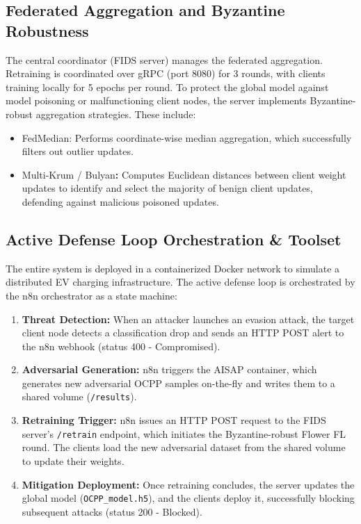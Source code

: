 \documentclass[10pt, a4paper, conference]{IEEEtran}
\begin{document}
\subsection{Federated Aggregation and Byzantine Robustness}
The central coordinator (FIDS server) manages the federated aggregation. Retraining is coordinated over gRPC (port 8080) for 3 rounds, with clients training locally for 5 epochs per round. To protect the global model against model poisoning or malfunctioning client nodes, the server implements Byzantine-robust aggregation strategies. These include:
\begin{itemize}
    \item FedMedian: Performs coordinate-wise median aggregation, which successfully filters out outlier updates.
    \item Multi-Krum / Bulyan\textbf{:} Computes Euclidean distances between client weight updates to identify and select the majority of benign client updates, defending against malicious poisoned updates.
\end{itemize}

\subsection{Active Defense Loop Orchestration \& Toolset}
The entire system is deployed in a containerized Docker network to simulate a distributed EV charging infrastructure. The active defense loop is orchestrated by the n8n orchestrator as a state machine:
\begin{enumerate}
    \item \textbf{Threat Detection:} When an attacker launches an evasion attack, the target client node detects a classification drop and sends an HTTP POST alert to the n8n webhook (status 400 - Compromised).
    \item \textbf{Adversarial Generation:} n8n triggers the AISAP container, which generates new adversarial OCPP samples on-the-fly and writes them to a shared volume (\texttt{/results}).
    \item \textbf{Retraining Trigger:} n8n issues an HTTP POST request to the FIDS server's \texttt{/retrain} endpoint, which initiates the Byzantine-robust Flower FL round. The clients load the new adversarial dataset from the shared volume to update their weights.
    \item \textbf{Mitigation Deployment:} Once retraining concludes, the server updates the global model (\texttt{OCPP\_model.h5}), and the clients deploy it, successfully blocking subsequent attacks (status 200 - Blocked).
\end{enumerate}
\end{document}
